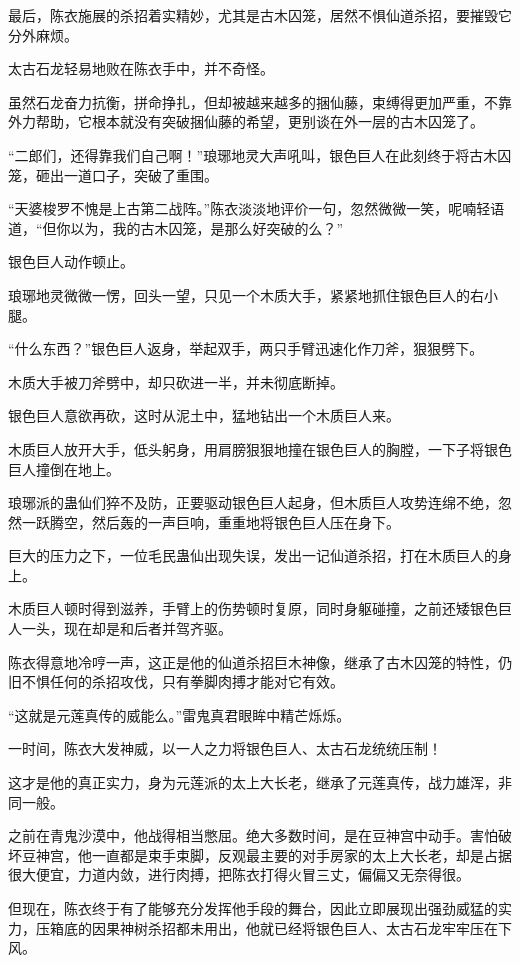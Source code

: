 \begin{this_body}
最后，陈衣施展的杀招着实精妙，尤其是古木囚笼，居然不惧仙道杀招，要摧毁它分外麻烦。

太古石龙轻易地败在陈衣手中，并不奇怪。

虽然石龙奋力抗衡，拼命挣扎，但却被越来越多的捆仙藤，束缚得更加严重，不靠外力帮助，它根本就没有突破捆仙藤的希望，更别谈在外一层的古木囚笼了。

“二郎们，还得靠我们自己啊！”琅琊地灵大声吼叫，银色巨人在此刻终于将古木囚笼，砸出一道口子，突破了重围。

“天婆梭罗不愧是上古第二战阵。”陈衣淡淡地评价一句，忽然微微一笑，呢喃轻语道，“但你以为，我的古木囚笼，是那么好突破的么？”

银色巨人动作顿止。

琅琊地灵微微一愣，回头一望，只见一个木质大手，紧紧地抓住银色巨人的右小腿。

“什么东西？”银色巨人返身，举起双手，两只手臂迅速化作刀斧，狠狠劈下。

木质大手被刀斧劈中，却只砍进一半，并未彻底断掉。

银色巨人意欲再砍，这时从泥土中，猛地钻出一个木质巨人来。

木质巨人放开大手，低头躬身，用肩膀狠狠地撞在银色巨人的胸膛，一下子将银色巨人撞倒在地上。

琅琊派的蛊仙们猝不及防，正要驱动银色巨人起身，但木质巨人攻势连绵不绝，忽然一跃腾空，然后轰的一声巨响，重重地将银色巨人压在身下。

巨大的压力之下，一位毛民蛊仙出现失误，发出一记仙道杀招，打在木质巨人的身上。

木质巨人顿时得到滋养，手臂上的伤势顿时复原，同时身躯碰撞，之前还矮银色巨人一头，现在却是和后者并驾齐驱。

陈衣得意地冷哼一声，这正是他的仙道杀招巨木神像，继承了古木囚笼的特性，仍旧不惧任何的杀招攻伐，只有拳脚肉搏才能对它有效。

“这就是元莲真传的威能么。”雷鬼真君眼眸中精芒烁烁。

一时间，陈衣大发神威，以一人之力将银色巨人、太古石龙统统压制！

这才是他的真正实力，身为元莲派的太上大长老，继承了元莲真传，战力雄浑，非同一般。

之前在青鬼沙漠中，他战得相当憋屈。绝大多数时间，是在豆神宫中动手。害怕破坏豆神宫，他一直都是束手束脚，反观最主要的对手房家的太上大长老，却是占据很大便宜，力道内敛，进行肉搏，把陈衣打得火冒三丈，偏偏又无奈得很。

但现在，陈衣终于有了能够充分发挥他手段的舞台，因此立即展现出强劲威猛的实力，压箱底的因果神树杀招都未用出，他就已经将银色巨人、太古石龙牢牢压在下风。

\end{this_body}

